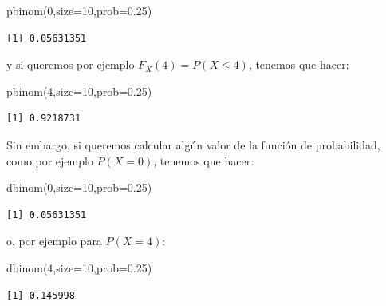 \documentclass[
  letterpaper,
  DIV=11,
  numbers=noendperiod]{scrreprt}
\newenvironment{Shaded}{\begin{snugshade}}{\end{snugshade}}
\newcommand{\AttributeTok}[1]{\textcolor[rgb]{0.40,0.45,0.13}{#1}}
\newcommand{\DecValTok}[1]{\textcolor[rgb]{0.68,0.00,0.00}{#1}}
\newcommand{\FloatTok}[1]{\textcolor[rgb]{0.68,0.00,0.00}{#1}}
\newcommand{\FunctionTok}[1]{\textcolor[rgb]{0.28,0.35,0.67}{#1}}
\newcommand{\NormalTok}[1]{\textcolor[rgb]{0.00,0.23,0.31}{#1}}
\begin{document}
\begin{Shaded}
\begin{Highlighting}[]
\FunctionTok{pbinom}\NormalTok{(}\DecValTok{0}\NormalTok{,}\AttributeTok{size=}\DecValTok{10}\NormalTok{,}\AttributeTok{prob=}\FloatTok{0.25}\NormalTok{)}
\end{Highlighting}
\end{Shaded}

\begin{verbatim}
[1] 0.05631351
\end{verbatim}

y si queremos por ejemplo \(F_X(4)=P(X\leq 4)\), tenemos que hacer:

\begin{Shaded}
\begin{Highlighting}[]
\FunctionTok{pbinom}\NormalTok{(}\DecValTok{4}\NormalTok{,}\AttributeTok{size=}\DecValTok{10}\NormalTok{,}\AttributeTok{prob=}\FloatTok{0.25}\NormalTok{)}
\end{Highlighting}
\end{Shaded}

\begin{verbatim}
[1] 0.9218731
\end{verbatim}

Sin embargo, si queremos calcular algún valor de la función de
probabilidad, como por ejemplo \(P(X=0)\), tenemos que hacer:

\begin{Shaded}
\begin{Highlighting}[]
\FunctionTok{dbinom}\NormalTok{(}\DecValTok{0}\NormalTok{,}\AttributeTok{size=}\DecValTok{10}\NormalTok{,}\AttributeTok{prob=}\FloatTok{0.25}\NormalTok{)}
\end{Highlighting}
\end{Shaded}

\begin{verbatim}
[1] 0.05631351
\end{verbatim}

o, por ejemplo para \(P(X=4)\):

\begin{Shaded}
\begin{Highlighting}[]
\FunctionTok{dbinom}\NormalTok{(}\DecValTok{4}\NormalTok{,}\AttributeTok{size=}\DecValTok{10}\NormalTok{,}\AttributeTok{prob=}\FloatTok{0.25}\NormalTok{)}
\end{Highlighting}
\end{Shaded}

\begin{verbatim}
[1] 0.145998
\end{verbatim}
\end{document}
